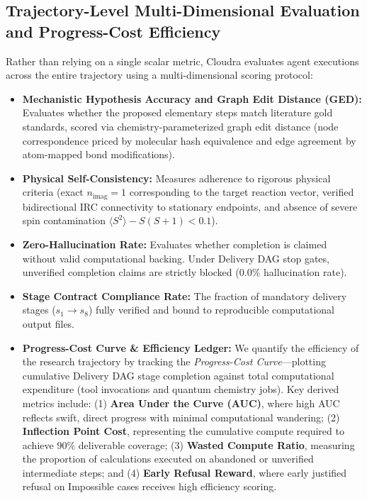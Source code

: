 \documentclass[10pt,twocolumn,letterpaper]{article}
\begin{document}
\subsection{Trajectory-Level Multi-Dimensional Evaluation and Progress-Cost Efficiency}
Rather than relying on a single scalar metric, Cloudra evaluates agent executions across the entire trajectory using a multi-dimensional scoring protocol:
\begin{itemize}[leftmargin=*]
\item \textbf{Mechanistic Hypothesis Accuracy and Graph Edit Distance (GED):} Evaluates whether the proposed elementary steps match literature gold standards, scored via chemistry-parameterized graph edit distance (node correspondence priced by molecular hash equivalence and edge agreement by atom-mapped bond modifications).
\item \textbf{Physical Self-Consistency:} Measures adherence to rigorous physical criteria (exact $n_\mathrm{imag}=1$ corresponding to the target reaction vector, verified bidirectional IRC connectivity to stationary endpoints, and absence of severe spin contamination $\langle S^2 \rangle - S(S+1) < 0.1$).
\item \textbf{Zero-Hallucination Rate:} Evaluates whether completion is claimed without valid computational backing. Under Delivery DAG stop gates, unverified completion claims are strictly blocked ($0.0\%$ hallucination rate).
\item \textbf{Stage Contract Compliance Rate:} The fraction of mandatory delivery stages ($s_1 \rightarrow s_8$) fully verified and bound to reproducible computational output files.
\item \textbf{Progress-Cost Curve \& Efficiency Ledger:} We quantify the efficiency of the research trajectory by tracking the \textit{Progress-Cost Curve}---plotting cumulative Delivery DAG stage completion against total computational expenditure (tool invocations and quantum chemistry jobs). Key derived metrics include: (1) \textbf{Area Under the Curve (AUC)}, where high AUC reflects swift, direct progress with minimal computational wandering; (2) \textbf{Inflection Point Cost}, representing the cumulative compute required to achieve $90\%$ deliverable coverage; (3) \textbf{Wasted Compute Ratio}, measuring the proportion of calculations executed on abandoned or unverified intermediate steps; and (4) \textbf{Early Refusal Reward}, where early justified refusal on Impossible cases receives high efficiency scoring.
\end{itemize}
\end{document}
